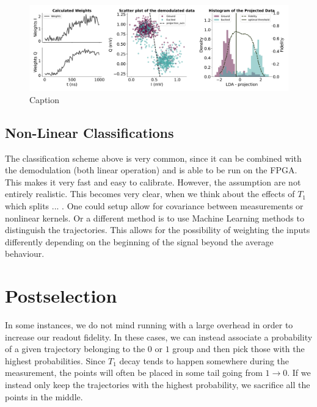\begin{figure}
    \centering
    \includegraphics{Readout/Figs/Weighted.pdf}
    \caption{Caption}
    \label{fig:matched_weights_fidelty}
\end{figure}


\subsection{Non-Linear Classifications}
The classification scheme above is very common, since it can be combined with the demodulation (both linear operation) and is able to be run on the FPGA. This makes it very fast and easy to calibrate. However, the assumption are not entirely realistic. This becomes very clear, when we think about the effects of $T_1$ which splits ... . One could setup allow for covariance between measurements or nonlinear kernels. Or a different method is to use Machine Learning methods to distinguish the trajectories. This allows for the possibility of weighting the inputs differently depending on the beginning of the signal beyond the average behaviour.



\section{Postselection}
In some instances, we do not mind running with a large overhead in order to increase our readout fidelity. In these cases, we can instead associate a probability of a given trajectory belonging to the $0$ or $1$ group and then pick those with the highest probabilities. Since $T_1$ decay tends to happen somewhere during the measurement, the points will often be placed in some tail going from $1 \to 0$. If we instead only keep the trajectories with the highest probability, we sacrifice all the points in the middle.

